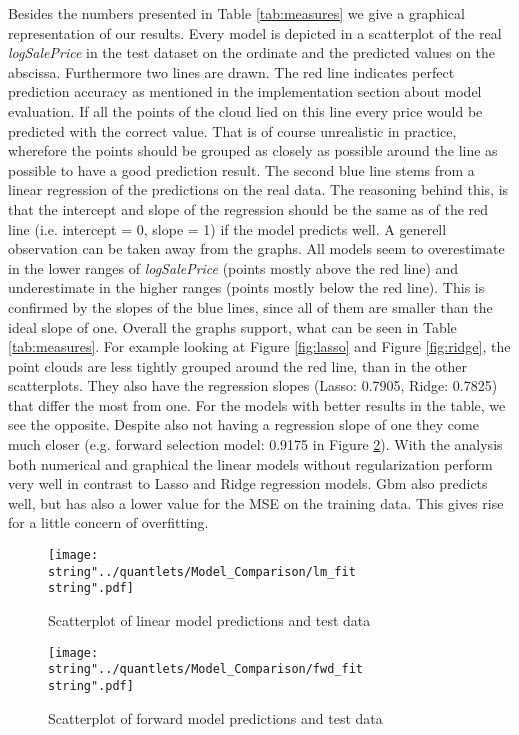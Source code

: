 Besides the numbers presented in Table \ref{tab:measures} we give a graphical representation of our results. Every model is depicted in a scatterplot of the real \textit{logSalePrice} in the test dataset on the ordinate and the predicted values on the abscissa. Furthermore two lines are drawn. The red line indicates perfect prediction accuracy as mentioned in the implementation section about model evaluation. If all the points of the cloud lied on this line every price would be predicted with the correct value. That is of course unrealistic in practice, wherefore the points should be grouped as closely as possible around the line as possible to have a good prediction result. The second blue line stems from a linear regression of the predictions on the real data. The reasoning behind this, is that the intercept and slope of the regression should be the same as of the red line (i.e. intercept = 0, slope = 1) if the model predicts well. A generell observation can be taken away from the graphs. All models seem to overestimate in the lower ranges of \textit{logSalePrice} (points mostly above the red line) and underestimate in the higher ranges (points mostly below the red line). This is confirmed by the slopes of the blue lines, since all of them are smaller than the ideal slope of one. Overall the graphs support, what can be seen in Table \ref{tab:measures}. For example looking at Figure \ref{fig:lasso} and Figure \ref{fig:ridge}, the point clouds are less tightly grouped around the red line, than in the other scatterplots. They also have the regression slopes (Lasso: 0.7905, Ridge: 0.7825) that differ the most from one. For the models with better results in the table, we see the opposite. Despite also not having a regression slope of one they come much closer (e.g. forward selection model: 0.9175 in Figure \ref{fig:fwd}). With the analysis both numerical and graphical the linear models without regularization perform very well in contrast to Lasso and Ridge regression models. Gbm also predicts well, but has also a lower value for the MSE on the training data. This gives rise for a little concern of overfitting.    




\begin{figure}[H]
\centering
	\texttt{[image: \\string"../quantlets/Model\_Comparison/lm\_fit\\string".pdf]}
  	\caption{Scatterplot of linear model predictions and test data}
  	\label{fig:lm}
\end{figure}

\begin{figure}[H]
\centering
	\texttt{[image: \\string"../quantlets/Model\_Comparison/fwd\_fit\\string".pdf]}
  	\caption{Scatterplot of forward model predictions and test data}
  	\label{fig:fwd}
\end{figure}

